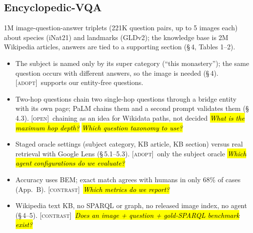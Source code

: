 \documentclass[10pt,a4paper]{article}
\newcommand{\adopt}{\textsc{[adopt]}}
\newcommand{\contrast}{\textsc{[contrast]}}
\newcommand{\open}{\textsc{[open]}}
\newcommand{\q}[1]{\hl{\footnotesize\itshape #1}}
\begin{document}
\subsection*{Encyclopedic-VQA \cite{mensink2023encyclopedic}}
1M image-question-answer triplets (221K question pairs, up to 5
images each) about species (iNat21) and landmarks (GLDv2); the
knowledge base is 2M Wikipedia articles, answers are tied to a
supporting section (\S\,4, Tables 1--2).
\begin{itemize}
  \item The subject is named only by its super category (``this
    monastery''); the same question occurs with different answers, so
    the image is needed (\S\,4). \adopt\ supports our entity-free questions.
  \item Two-hop questions chain two single-hop questions through a
    bridge entity with its own page; PaLM chains them and a second
    prompt validates them (\S\,4.3). \open\ chaining as an idea for
    Wikidata paths, not decided \q{What is the maximum hop depth?}
    \q{Which question taxonomy to use?}
  \item Staged oracle settings (subject category, KB article, KB
    section) versus real retrieval with Google Lens (\S\,5.1--5.3).
    \adopt\ only the subject oracle \q{Which agent configurations do
    we evaluate?}
  \item Accuracy uses BEM; exact match agrees with humans in only
    68\% of cases (App.~B). \contrast\ \q{Which metrics do we report?}
  \item Wikipedia text KB, no SPARQL or graph, no released image
    index, no agent (\S\,4--5). \contrast\ \q{Does an image +
    question + gold-SPARQL benchmark exist?}
\end{itemize}
\end{document}
